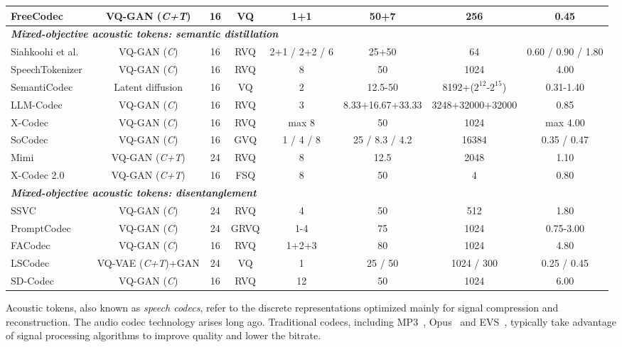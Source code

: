 \begin{table*}[]
{\begin{tabular}{@{}lccccccc@{}}
FreeCodec~\cite{zheng2024freecodecdisentangledneuralspeech} & VQ-GAN (\textit{C+T})& 16 & VQ & 1+1 & 50+7 & 256 & 0.45  \\
\midrule
\multicolumn{6}{l}{\textbf{\textit{Mixed-objective acoustic tokens: semantic distillation}}} \\
{Siahkoohi et al.}~\cite{siahkoohi22_interspeech} & VQ-GAN (\textit{C})& 16 & RVQ & 2+1 / 2+2 / 6 & 25+50 & 64 & 0.60 / 0.90 / 1.80\\
SpeechTokenizer~\cite{zhang2024speechtokenizer} & VQ-GAN (\textit{C})& 16 & RVQ & 8 & 50 & 1024 & 4.00 \\
SemantiCodec~\cite{liu2024semanticodec} & Latent diffusion & 16 & VQ & 2 & 12.5-50 & {8192+($2^{12}$-$2^{15}$)} & 0.31-1.40 \\
LLM-Codec~\cite{yang2024uniaudio15} & VQ-GAN (\textit{C})& 16 & RVQ & 3 & 8.33+16.67+33.33 & 3248+32000+32000& 0.85 \\
X-Codec~\cite{ye2024codec} & VQ-GAN (\textit{C})& 16 & RVQ & max 8 & 50 & 1024 & max 4.00 \\
SoCodec~\cite{guo2024socodec} & VQ-GAN (\textit{C})& 16 & GVQ & 1 / 4 / 8 & 25 / 8.3 / 4.2 & 16384 & 0.35 / 0.47 \\
Mimi~\cite{kyutai2024moshi} & VQ-GAN (\textit{C+T})& 24 & RVQ & 8 & 12.5 & 2048 & 1.10 \\
X-Codec 2.0~\cite{ye2025llasa} & VQ-GAN (\textit{C+T}) & 16 & FSQ & 8 & 50 & 4 & 0.80 \\
\midrule
\multicolumn{6}{l}{\textbf{\textit{Mixed-objective acoustic tokens: disentanglement}}} \\
SSVC~\cite{SSVC} & VQ-GAN (\textit{C})& 24 & RVQ & 4 & 50 & 512 & 1.80 \\
PromptCodec~\cite{pan2024promptcodec} & VQ-GAN (\textit{C})& 24 & GRVQ & 1-4 & 75 & 1024 & 0.75-3.00 \\
FACodec~\cite{facodec} & VQ-GAN (\textit{C})& 16 & RVQ & 1+2+3 & 80 & 1024 & 4.80 \\
LSCodec~\cite{guo2024lscodec} & VQ-VAE (\textit{C+T})+GAN& 24 &  VQ & 1 & 25 / 50 & 1024 / 300& 0.25 / 0.45 \\
SD-Codec~\cite{bie2024learning} & VQ-GAN (\textit{C})& 16 &  RVQ & 12 & 50 & 1024 & 6.00 \\
\bottomrule
\end{tabular}
}
\end{table*}

Acoustic tokens, also known as \textit{speech codecs}, refer to the discrete representations optimized mainly for signal compression and reconstruction.
The audio codec technology arises long ago.
Traditional codecs, including 
MP3~\cite{rfc5219}, Opus~\cite{Valin2012DefinitionOT} and EVS~\cite{dietz2015overview}, typically take advantage of signal processing algorithms to improve quality and lower the bitrate.

